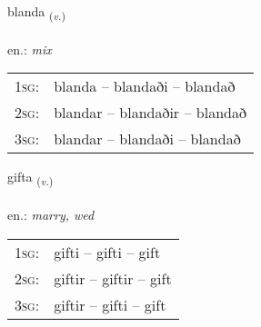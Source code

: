 \documentclass[frontgrid, backgrid]{flacards}\usepackage[]{graphicx}\usepackage[]{xcolor}
\begin{document}
\renewcommand{\blhead}{\vskip5pt {\small\bfseries\footnotesize Sagnorð | Verb }}
\renewcommand{\bcfoot}{\vskip5pt \hspace{2pt}{\small\bfseries\footnotesize 2K}}


{blanda \small{\textsubscript{(\textit{v.})}} \\[1ex] %
\textphonetic{[planta]} \\
en.: \emph{mix} \\  [2ex]
\renewcommand*{\arraystretch}{0.8}
\begin{tabular}{p{1cm}l}
\textsc{1sg}: & blanda -- blandaði -- blandað \\ 
\textsc{2sg}: & blandar -- blandaðir -- blandað \\ 
\textsc{3sg}: & blandar -- blandaði -- blandað \\ 
\end{tabular}
}

\renewcommand{\flhead}{\vskip5pt \fboxsep=0pt {\small\bfseries\footnotesize Sagnorð | Verb}}
\renewcommand{\fcfoot}{\vskip5pt \fboxsep=0pt \hspace{2pt}{\small\bfseries\footnotesize 2K}}

\renewcommand{\blhead}{\vskip5pt {\small\bfseries\footnotesize Sagnorð | Verb }}
\renewcommand{\bcfoot}{\vskip5pt \hspace{2pt}{\small\bfseries\footnotesize 2K}}


{gifta \small{\textsubscript{(\textit{v.})}} \\[1ex] %
\textphonetic{[cɪfta]} \\
en.: \emph{marry, wed} \\  [2ex]
\renewcommand*{\arraystretch}{0.8}
\begin{tabular}{p{1cm}l}
\textsc{1sg}: & gifti -- gifti -- gift \\ 
\textsc{2sg}: & giftir -- giftir -- gift \\ 
\textsc{3sg}: & giftir -- gifti -- gift \\ 
\end{tabular}
}
\end{document}
